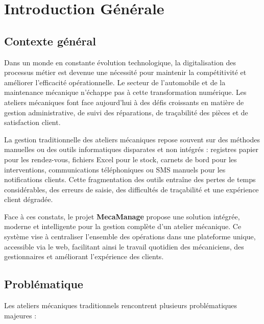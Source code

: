 \chapter*{Introduction Générale}

\section*{Contexte général}

Dans un monde en constante évolution technologique, la digitalisation des processus métier est devenue une nécessité pour maintenir la compétitivité et améliorer l'efficacité opérationnelle. Le secteur de l'automobile et de la maintenance mécanique n'échappe pas à cette transformation numérique. Les ateliers mécaniques font face aujourd'hui à des défis croissants en matière de gestion administrative, de suivi des réparations, de traçabilité des pièces et de satisfaction client.

La gestion traditionnelle des ateliers mécaniques repose souvent sur des méthodes manuelles ou des outils informatiques disparates et non intégrés : registres papier pour les rendez-vous, fichiers Excel pour le stock, carnets de bord pour les interventions, communications téléphoniques ou SMS manuels pour les notifications clients. Cette fragmentation des outils entraîne des pertes de temps considérables, des erreurs de saisie, des difficultés de traçabilité et une expérience client dégradée.

Face à ces constats, le projet \textbf{MecaManage} propose une solution intégrée, moderne et intelligente pour la gestion complète d'un atelier mécanique. Ce système vise à centraliser l'ensemble des opérations dans une plateforme unique, accessible via le web, facilitant ainsi le travail quotidien des mécaniciens, des gestionnaires et améliorant l'expérience des clients.

\section*{Problématique}

Les ateliers mécaniques traditionnels rencontrent plusieurs problématiques majeures :

